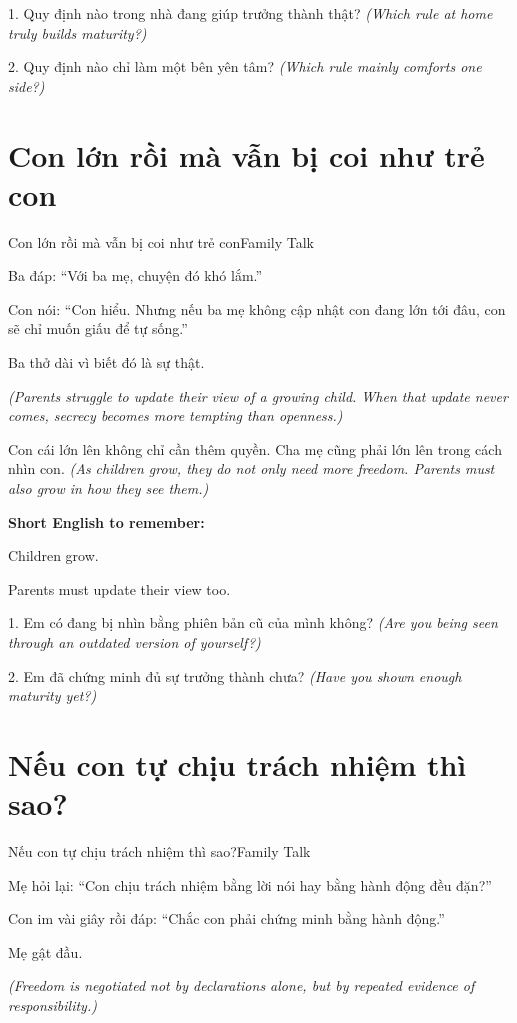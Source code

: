 \begin{tuhocnhanh}
1. Quy định nào trong nhà đang giúp trưởng thành thật? \textit{(Which rule at home truly builds maturity?)}

2. Quy định nào chỉ làm một bên yên tâm? \textit{(Which rule mainly comforts one side?)}
\end{tuhocnhanh}
\ngancach

\section{Con lớn rồi mà vẫn bị coi như trẻ con}
\begin{truyen}{Con lớn rồi mà vẫn bị coi như trẻ con}{Family Talk}

Ba đáp: ``Với ba mẹ, chuyện đó khó lắm.''

Con nói: ``Con hiểu. Nhưng nếu ba mẹ không cập nhật con đang lớn tới đâu, con sẽ chỉ muốn giấu để tự sống.''

Ba thở dài vì biết đó là sự thật.

\textit{(Parents struggle to update their view of a growing child. When that update never comes, secrecy becomes more tempting than openness.)}
\end{truyen}

\begin{baihoc}
Con cái lớn lên không chỉ cần thêm quyền. Cha mẹ cũng phải lớn lên trong cách nhìn con.
\textit{(As children grow, they do not only need more freedom. Parents must also grow in how they see them.)}
\end{baihoc}

\begin{ghinhoanh}
\textbf{Short English to remember:}

Children grow.

Parents must update their view too.
\end{ghinhoanh}

\begin{tuhocnhanh}
1. Em có đang bị nhìn bằng phiên bản cũ của mình không? \textit{(Are you being seen through an outdated version of yourself?)}

2. Em đã chứng minh đủ sự trưởng thành chưa? \textit{(Have you shown enough maturity yet?)}
\end{tuhocnhanh}
\ngancach

\section{Nếu con tự chịu trách nhiệm thì sao?}
\begin{truyen}{Nếu con tự chịu trách nhiệm thì sao?}{Family Talk}

Mẹ hỏi lại: ``Con chịu trách nhiệm bằng lời nói hay bằng hành động đều đặn?''

Con im vài giây rồi đáp: ``Chắc con phải chứng minh bằng hành động.''

Mẹ gật đầu.

\textit{(Freedom is negotiated not by declarations alone, but by repeated evidence of responsibility.)}
\end{truyen}


